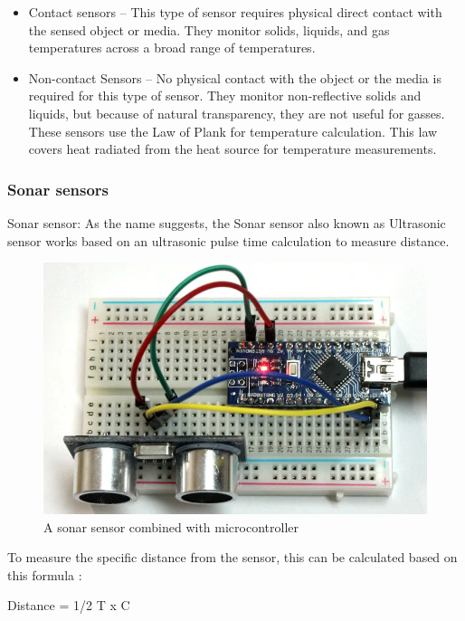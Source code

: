 \begin{itemize}
 \item Contact sensors – This type of sensor requires physical direct contact with the sensed object or media. They monitor solids, liquids, and gas temperatures across a broad range of temperatures.
 \item  Non-contact Sensors – No physical contact with the object or the media is required for this type of sensor. They monitor non-reflective solids and liquids, but because of natural transparency, they are not useful for gasses. These sensors use the Law of Plank for temperature calculation. This law covers heat radiated from the heat source for temperature measurements.

\end{itemize}


\subsubsection{Sonar sensors}


Sonar sensor: As the name suggests, the Sonar sensor also known as Ultrasonic sensor works based on an ultrasonic pulse time calculation to measure distance.


\begin{figure}[h]
  \centering
    \includegraphics[width=\linewidth]{figures/sonarSensor.png}
    \caption{A sonar sensor combined with microcontroller}
\label{fig:sonarSensor}
\end{figure}


To measure the specific distance from the sensor, this can be calculated based on this formula \cite{sonar1}:

Distance = 1/2 T x C 


